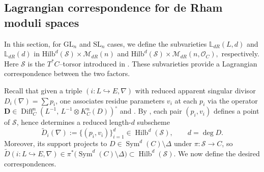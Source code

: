 \documentclass[twoside, 11pt]{article}
\numberwithin{equation}{section}
\theoremstyle{theorem}
\numberwithin{theorem}{section}
\theoremstyle{definition}
\begin{document}
\subsection{Lagrangian correspondence for de Rham moduli spaces}
In this section, for \(\mathrm{GL}_n\) and \(\mathrm{SL}_n\) cases, we define the subvarieties
\(\mathbb{L}_{dR}(L,d)\) and \(\mathbb{L}_{dR}(d)\) in
\(
\mathrm{Hilb}^d(\mathcal{S}) \times \mathcal{M}_{dR}(n)
\)
and
\(
\mathrm{Hilb}^d(\mathcal{S}) \times \mathcal{M}_{dR}(n, \mathcal{O}_C),
\)
respectively. Here $\mathcal{S}$ is the $T^\ast C$--torsor introduced in .
These subvarieties provide a Lagrangian correspondence between the two factors.

Recall that given a triple $(i\colon L\hookrightarrow E,\nabla)$ with reduced apparent singular divisor
$D_i(\nabla)=\sum p_i$, one associates residue parameters $v_i$ at each $p_i$ via the operator
\(
\mathbf D \in \operatorname{Diff}_C^{n} (L^{-1},\,L^{-1}\otimes K_C^{n}(D))^\circ
\)
and . By , each pair $(p_i,v_i)$ defines a point of $\mathcal{S}$, hence determines a reduced length-$d$ subscheme
\[
\widetilde{D}_i(\nabla):=\{(p_i,v_i)\}_{i=1}^d \in \operatorname{Hilb}^d(\mathcal{S}),
\qquad d=\deg D.
\]
Moreover, its support projects to $D\in \operatorname{Sym}^d(C)\setminus \Delta$ under $\pi:\mathcal{S}\to C$, so
\(
\widetilde{D}(i\colon L\hookrightarrow E,\nabla)\in \pi^\ast\bigl(\operatorname{Sym}^d(C)\setminus \Delta\bigr)\subset \operatorname{Hilb}^d(\mathcal{S}).
\)
We now define the desired correspondences.
\end{document}
